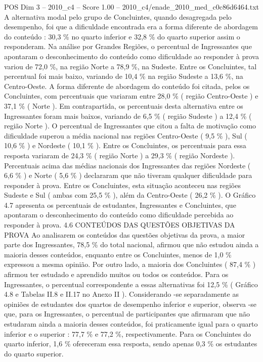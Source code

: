 \begin{textsample}{POS Dim 3 – 2010\_c4 – Score 1.00 – 2010\_c4/enade\_2010\_med\_c0c86d6464.txt}
A alternativa modal pelo grupo de Concluintes, quando desagregada pelo desempenho, foi que a dificuldade encontrada era a forma diferente de abordagem do conteúdo : 30,3 \% no quarto inferior e 32,8 \% do quarto superior assim o responderam.
Na análise por Grandes Regiões, o percentual de Ingressantes que apontaram o desconhecimento do conteúdo como dificuldade ao responder à prova variou de 72,0 \%, na região Norte a 78,9 \%, na Sudeste.
Entre os Concluintes, tal percentual foi mais baixo, variando de 10,4 \% na região Sudeste a 13,6 \%, na Centro-Oeste.
A forma diferente de abordagem do conteúdo foi citada, pelos os Concluintes, com percentuais que variaram entre 28,0 \% ( região Centro-Oeste ) e 37,1 \% ( Norte ).
Em contrapartida, os percentuais desta alternativa entre os Ingressantes foram mais baixos, variando de 6,5 \% ( região Sudeste ) a 12,4 \% ( região Norte ).
O percentual de Ingressantes que citou a falta de motivação como dificuldade superou a média nacional nas regiões Centro-Oeste ( 9,5 \% ), Sul ( 10,6 \% ) e Nordeste ( 10,1 \% ).
Entre os Concluintes, os percentuais para essa resposta variaram de 24,3 \% ( região Norte ) a 29,3 \% ( região Nordeste ).
Percentuais acima das médias nacionais dos Ingressantes das regiões Nordeste ( 6,6 \% ) e Norte ( 5,6 \% ) declararam que não tiveram qualquer dificuldade para responder à prova.
Entre os Concluintes, esta situação aconteceu nas regiões Sudeste e Sul ( ambas com 25,5 \% ), além da Centro-Oeste ( 26,2 \% ).
O Gráfico 4.7 apresenta os percentuais de estudantes, Ingressantes e Concluintes, que apontaram o desconhecimento do conteúdo como dificuldade percebida ao responder à prova. 4.6 CONTEÚDOS DAS QUESTÕES OBJETIVAS DA PROVA Ao analisarem os conteúdos das questões objetivas da prova, a maior parte dos Ingressantes, 78,5 \% do total nacional, afirmou que não estudou ainda a maioria desses conteúdos, enquanto entre os Concluintes, menos de 1,0 \% expressou a mesma opinião.
Por outro lado, a maioria dos Concluintes ( 87,4 \% ) afirmou ter estudado e aprendido muitos ou todos os conteúdos.
Para os Ingressantes, o percentual correspondente a essas alternativas foi 12,5 \% ( Gráfico 4.8 e Tabelas II.8 e II.17 no Anexo II ).
Considerando -se separadamente as opiniões de estudantes dos quartos de desempenho inferior e superior, observa -se que, para os Ingressantes, o percentual de participantes que afirmaram que não estudaram ainda a maioria desses conteúdos, foi praticamente igual para o quarto inferior e o superior : 77,7 \% e 77,2 \%, respectivamente.
Para os Concluintes do quarto inferior, 1,6 \% ofereceram essa resposta, sendo apenas 0,3 \% os estudantes do quarto superior.

\end{textsample}
